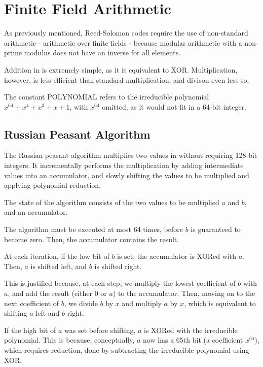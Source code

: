 \chapter{Finite Field Arithmetic}

As previously mentioned, Reed-Solomon codes require the use of non-standard arithmetic - arithmetic over finite fields - because modular arithmetic with a non-prime modulus does not have an inverse for all elements.

Addition in  is extremely simple, as it is equivalent to XOR.
Multiplication, however, is less efficient than standard multiplication, and divison even less so.

The constant $\text{POLYNOMIAL}$ refers to the irreducible polynomial $x^{64} + x^4 + x^3 + x + 1$, with $x^{64}$ omitted, as it would not fit in a 64-bit integer.

\section{Russian Peasant Algorithm}

The Russian peasant algorithm multiplies two values in  without requiring 128-bit integers.
It incrementally performs the multiplication by adding intermediate values into an accumulator, and slowly shifting the values to be multiplied and applying polynomial reduction.

The state of the algorithm consists of the two values to be multiplied $a$ and $b$, and an accumulator.

The algorithm must be executed at most 64 times, before $b$ is guaranteed to become zero. Then, the accumulator contains the result.

At each iteration, if the low bit of $b$ is set, the accumulator is XORed with $a$.
Then, $a$ is shifted left, and $b$ is shifted right.

This is justified because, at each step, we multiply the lowest coefficient of $b$ with $a$, and add the result (either $0$ or $a$) to the accumulator.
Then, moving on to the next coefficient of $b$, we divide $b$ by $x$ and multiply $a$ by $x$, which is equivalent to shifting $a$ left and $b$ right.

If the high bit of $a$ was set before shifting, $a$ is XORed with the irreducible polynomial.
This is because, conceptually, $a$ now has a 65th bit (a coefficient $x^{64}$), which requires reduction, done by subtracting the irreducible polynomial using XOR.

